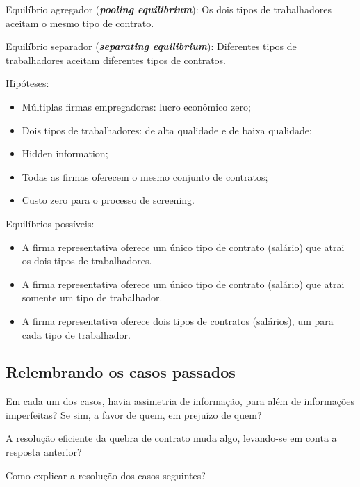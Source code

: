 \documentclass[a4paper,12pt]{article}[abntex2]
\begin{document}
Equilíbrio agregador (\textit{\textbf{pooling equilibrium}}): Os dois tipos de trabalhadores aceitam o mesmo tipo de contrato.

Equilíbrio separador (\textit{\textbf{separating equilibrium}}): Diferentes tipos de trabalhadores aceitam diferentes tipos de contratos.

Hipóteses:\begin{itemize}
    \item Múltiplas firmas empregadoras: lucro econômico zero;
    \item Dois tipos de trabalhadores: de alta qualidade e de baixa qualidade;
    \item Hidden information;
    \item Todas as firmas oferecem o mesmo conjunto de contratos;
    \item Custo zero para o processo de screening.
\end{itemize}

Equilíbrios possíveis:\begin{itemize}
    \item A firma representativa oferece um único tipo de contrato (salário) que atrai os dois tipos de trabalhadores.
    \item A firma representativa oferece um único tipo de contrato (salário) que atrai somente um tipo de trabalhador.
    \item A firma representativa oferece dois tipos de contratos (salários), um para cada tipo de trabalhador.
\end{itemize}

\subsection{\textbf{Relembrando os casos passados}}
Em cada um dos casos, havia assimetria de informação, para além de informações imperfeitas? Se sim, a favor de quem, em prejuízo de quem?

A resolução eficiente da quebra de contrato muda algo, levando-se em conta a resposta anterior?

Como explicar a resolução dos casos seguintes?
\end{document}
